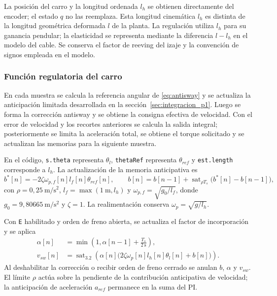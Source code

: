 \documentclass[a4paper,10pt,onecolumn,journal]{ieeeconf}
\numberwithin{equation}{section}
\begin{document}
La posición del carro y la longitud ordenada $l_h$ se obtienen directamente del encoder; el estado $q$ no las reemplaza. Esta longitud cinemática $l_h$ es distinta de la longitud geométrica deformada $l$ de la planta. La regulación utiliza $l_h$ para su ganancia pendular; la elasticidad se representa mediante la diferencia $l-l_h$ en el modelo del cable. Se conserva el factor de reeving del izaje y la convención de signos empleada en el modelo.


\subsubsection{Función regulatoria del carro}

En cada muestra se calcula la referencia angular de \eqref{eq:antisway} y se actualiza la anticipación limitada desarrollada en la sección~\ref{sec:integracion_p1}. Luego se forma la corrección antisway y se obtiene la consigna efectiva de velocidad. Con el error de velocidad y los recortes anteriores se calcula la salida integral; posteriormente se limita la aceleración total, se obtiene el torque solicitado y se actualizan las memorias para la siguiente muestra.

En el código, \texttt{s.theta} representa $\theta_l$, \texttt{thetaRef} representa $\theta_{ref}$ y \texttt{est.length} corresponde a $l_h$. La actualización de la memoria anticipativa es
\begin{equation}
b^*[n]=-2\zeta\omega_{p,f}[n]l_f[n]\theta_{ref}[n],\qquad
b[n]=b[n-1]+\operatorname{sat}_{\rho T_s}\big(b^*[n]-b[n-1]\big),
\end{equation}
con $\rho=0{,}25~\mathrm{m/s^2}$, $l_f=\max(1~\mathrm{m},l_h)$ y $\omega_{p,f}=\sqrt{g_0/l_f}$, donde $g_0=9{,}80665~\mathrm{m/s^2}$ y $\zeta=1$. La realimentación conserva $\omega_p=\sqrt{g/l_h}$.

Con \texttt{E} habilitado y orden de freno abierta, se actualiza el factor de incorporación y se aplica
\begin{align}
\alpha[n]&=\min\left(1,\alpha[n-1]+\frac{T_s}{2~\mathrm{s}}\right),\\
v_{sw}[n]&=\operatorname{sat}_{3.2}\left(\alpha[n]\big(2\zeta\omega_p[n]l_h[n]\theta_l[n]+b[n]\big)\right).
\end{align}
Al deshabilitar la corrección o recibir orden de freno cerrado se anulan $b$, $\alpha$ y $v_{sw}$. El límite $\rho$ actúa sobre la pendiente de la contribución anticipativa de velocidad; la anticipación de aceleración $a_{ref}$ permanece en la suma del PI.
\end{document}
